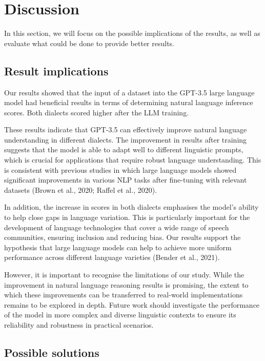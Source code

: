 \documentclass[fleqn,moreauthors,10pt]{ds_report}
\begin{document}
\vspace{\baselineskip}
\section{Discussion}
In this section, we will focus on the possible implications of the results, as well as evaluate what could be done to provide better results.

\subsection{Result implications}
Our results showed that the input of a dataset into the GPT-3.5 large language model had beneficial results in terms of determining natural language inference scores. Both dialects scored higher after the LLM training. 

These results indicate that GPT-3.5 can effectively improve natural language understanding in different dialects. The improvement in results after training suggests that the model is able to adapt well to different linguistic prompts, which is crucial for applications that require robust language understanding. This is consistent with previous studies in which large language models showed significant improvements in various NLP tasks after fine-tuning with relevant datasets (Brown et al., 2020; Raffel et al., 2020).

In addition, the increase in scores in both dialects emphasises the model's ability to help close gaps in language variation. This is particularly important for the development of language technologies that cover a wide range of speech communities, ensuring inclusion and reducing bias. Our results support the hypothesis that large language models can help to achieve more uniform performance across different language varieties (Bender et al., 2021).

However, it is important to recognise the limitations of our study. While the improvement in natural language reasoning results is promising, the extent to which these improvements can be transferred to real-world implementations remains to be explored in depth. Future work should investigate the performance of the model in more complex and diverse linguistic contexts to ensure its reliability and robustness in practical scenarios.

 

\subsection{Possible solutions}
\end{document}
